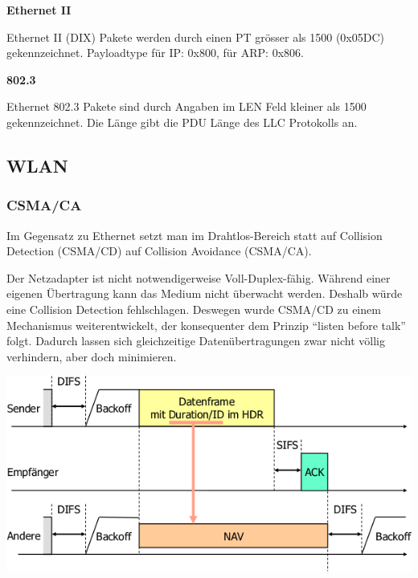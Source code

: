 \textbf{Ethernet II}

Ethernet II (DIX) Pakete werden durch einen PT grösser als 1500
(0x05DC) gekennzeichnet. Payloadtype für IP: 0x800, für ARP: 0x806.

\textbf{802.3}

Ethernet 802.3 Pakete sind durch Angaben im LEN Feld kleiner als 1500
gekennzeichnet. Die Länge gibt die PDU Länge des LLC Protokolls an.


\subsection{WLAN}

\subsubsection{CSMA/CA}

Im Gegensatz zu Ethernet setzt man im Drahtlos-Bereich statt auf Collision
Detection (CSMA/CD) auf Collision Avoidance (CSMA/CA).

Der Netzadapter ist nicht notwendigerweise Voll-Duplex-fähig. Während einer
eigenen Übertragung kann das Medium nicht überwacht werden. Deshalb würde eine
Collision Detection fehlschlagen. Deswegen wurde CSMA/CD zu einem Mechanismus
weiterentwickelt, der konsequenter dem Prinzip ``listen before talk'' folgt.
Dadurch lassen sich gleichzeitige Datenübertragungen zwar nicht völlig
verhindern, aber doch minimieren.

\begin{center}
	\includegraphics[width=.8\textwidth]{media/csma_ca.png}
\end{center}

